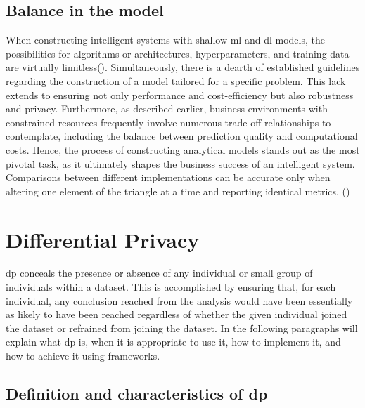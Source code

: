 \subsection{Balance in the model}

When constructing intelligent systems with shallow \acrshort{ml} and \acrshort{dl} models, the possibilities for algorithms or architectures, hyperparameters, and training data are virtually limitless(\cite{HEINRICH2021113494}). Simultaneously, there is a dearth of established guidelines regarding the construction of a model tailored for a specific problem. This lack extends to ensuring not only performance and cost-efficiency but also robustness and privacy. Furthermore, as described earlier, business environments with constrained resources frequently involve numerous trade-off relationships to contemplate, including the balance between prediction quality and computational costs. Hence, the process of constructing analytical models stands out as the most pivotal task, as it ultimately shapes the business success of an intelligent system. Comparisons between different implementations can be accurate only when altering one element of the triangle at a time and reporting identical metrics.
\newline(\cite{janiesch2021machine})


\section{Differential Privacy}

\acrfull{dp} conceals the presence or absence of any individual or small group of individuals within a dataset. This is accomplished by ensuring that, for each individual, any conclusion reached from the analysis would have been essentially as likely to have been reached regardless of whether the given individual joined the dataset or refrained from joining the dataset. In the following paragraphs will explain what \acrshort{dp} is, when it is appropriate to use it, how to implement it, and how to achieve it using frameworks. 

\subsection{Definition and characteristics of \acrshort{dp}}

